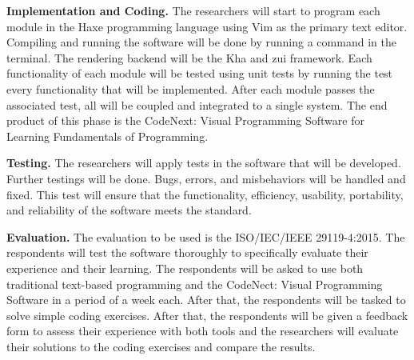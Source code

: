 \flushleft
\textbf{Implementation and Coding.}
\justifying
\parx
The researchers will start to program each module in the Haxe programming
language using Vim as the primary text editor. Compiling and running the software
will be done by running a command in the terminal. The rendering backend will be
the Kha and zui framework. Each functionality of each module will be tested
using unit tests by running the test every functionality that will be implemented.
After each module passes the associated test, all will be coupled and
integrated to a single system. The end product of this phase is the CodeNext:
Visual Programming Software for Learning Fundamentals of Programming.

\flushleft
\textbf{Testing.}
\justifying
\parx
The researchers will apply tests in the software that will be developed.
Further testings will be done. Bugs, errors, and misbehaviors will be handled
and fixed. This test will ensure that the functionality, efficiency,
usability, portability, and reliability of the software meets the standard.

\flushleft
\textbf{Evaluation.}
\justifying
\parx
The evaluation to be used is the ISO/IEC/IEEE 29119-4:2015. The respondents
will test the software thoroughly to specifically evaluate their experience and
their learning.
The respondents will be asked to use both traditional text-based programming and the
CodeNect: Visual Programming Software in a period of a week each. After that, the
respondents will be tasked to solve simple coding exercises. After that, the
respondents will be given a feedback form to assess their experience with both
tools and the researchers will evaluate their solutions to the coding exercises
and compare the results.
